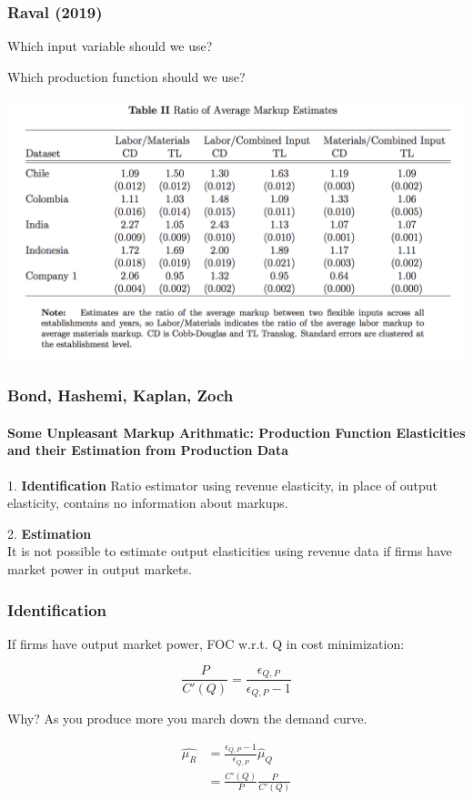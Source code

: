 \documentclass[11pt, aspectratio=169]{beamer}
\newcommand{\Skip}{\vspace{1em}}
\newenvironment{wideitemize}{\itemize\addtolength{\itemsep}{10pt}}{\enditemize}
\begin{document}
\begin{frame}[c]\frametitle{Raval (2019)}
    
\begin{wideitemize}
	\item Which input variable should we use?
	\item Which production function should we use?
\end{wideitemize}

\centering
\includegraphics[scale=.45]{RavalT2.png}

\end{frame}




\begin{frame}[c]\frametitle{Bond, Hashemi, Kaplan, Zoch}
\framesubtitle{Some Unpleasant Markup Arithmatic: Production Function Elasticities and their
Estimation from Production Data}    

\Skip
1. \textbf{Identification}
Ratio estimator using revenue elasticity, in place of output elasticity, contains
no information about markups.

\Skip\Skip\Skip
2. \textbf{Estimation}\\
It is not possible to estimate output elasticities using revenue data if firms have
market power in output markets.

\end{frame}


\begin{frame}[c]\frametitle{Identification}
    
If firms have output market power, FOC w.r.t. Q in cost minimization:

\[
	\frac{P}{C'(Q)} = \frac{\epsilon_{Q,P}}{\epsilon_{Q,P} - 1}
\]

\Skip\Skip
Why? As you produce more you march down the demand curve.

\begin{align*}
	\hat{\mu_R} &= \frac{\epsilon_{Q,P} - 1}{\epsilon_{Q,P}} \hat{\mu}_Q \\
	&= \frac{C'(Q)}{P} \frac{P}{C'(Q)}
\end{align*}


\end{frame}
\end{document}
